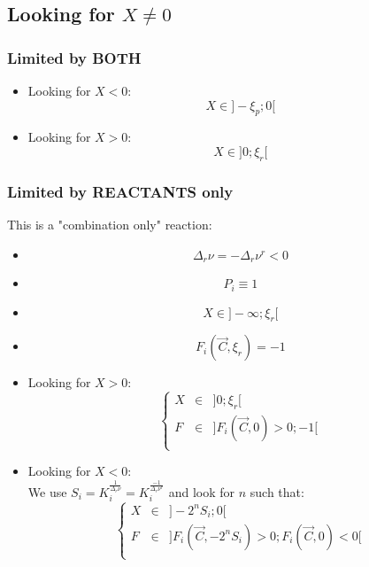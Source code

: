 \documentclass[aps,12pt]{revtex4}
\begin{document}
\subsection{Looking for $X\not=0$}
	
\subsubsection{Limited by BOTH}

\begin{itemize}
\item Looking for $X<0$:
$$
X \in \rbrack -\xi_p; 0 \lbrack
$$
\item Looking for $X>0$:
$$
X \in \rbrack 0; \xi_r \lbrack
$$
\end{itemize}

\subsubsection{Limited by REACTANTS only}
This is a "combination only" reaction:
\begin{itemize}
\item
$$
	\Delta_r \nu = - \Delta_r \nu^r < 0 
$$
\item $$P_i \equiv 1$$
\item $$X \in \rbrack -\infty; \xi_r \lbrack$$
\item $$F_i(\vec{C},\xi_r)=-1$$
\item Looking for $X>0$:
 $$
 \left\lbrace
 \begin{array}{rcl}
 	X &\in& \rbrack 0;\xi_r \lbrack\\
	F &\in& \rbrack F_i(\vec{C},0)>0 ; -1 \lbrack\\
\end{array}
\right.
 $$
 \item Looking for $X<0$:\\
 We use $S_i=K_i^{\frac{1}{\Delta_r \nu}}=K_i^{\frac{-1}{\Delta_r \nu^r}}$
 and look for $n$ such that:
 $$
 	\left\lbrace
 \begin{array}{rcl}
 	X &\in& \rbrack -2^n S_i;0 \lbrack\\
	F &\in& \rbrack F_i(\vec{C},-2^nS_i)>0 ; F_i(\vec{C},0)<0 \lbrack\\
\end{array}
\right.
 $$
\end{itemize}
 	
\end{document}
